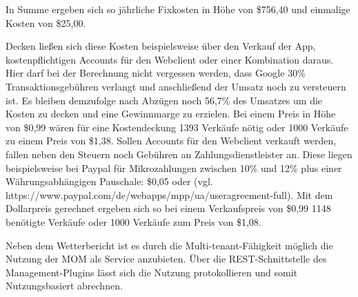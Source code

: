 In Summe ergeben sich so jährliche Fixkosten in Höhe von \$756,40 und einmalige Kosten von \$25,00.

Decken ließen sich diese Kosten beispielsweise über den Verkauf der App, kostenpflichtigen Accounts für den Webclient oder einer Kombination daraus. Hier darf bei der Berechnung nicht vergessen werden, dass Google 30\% Transaktionsgebühren verlangt und anschließend der Umsatz noch zu versteuern ist. Es bleiben demzufolge nach Abzügen noch 56,7\% des Umsatzes um die Kosten zu decken und eine Gewinnmarge zu erzielen. Bei einem Preis in Höhe von \$0,99 wären für eine Kostendeckung 1393 Verkäufe nötig oder 1000 Verkäufe zu einem Preis von \$1,38. Sollen Accounts für den Webclient verkauft werden, fallen neben den Steuern noch Gebühren an Zahlungsdienstleister an. Diese liegen beispielsweise bei Paypal für Mikrozahlungen zwischen 10\% und 12\% plus einer Währungsabhängigen Pauschale: \$0,05 oder  (vgl. https://www.paypal.com/de/webapps/mpp/ua/useragreement-full). Mit dem Dollarpreis gerechnet ergeben sich so bei einem Verkaufspreis von \$0,99 1148 benötigte Verkäufe oder 1000 Verkäufe zum Preis von \$1,08.

Neben dem Wetterbericht ist es durch die Multi-tenant-Fähigkeit möglich die Nutzung der MOM als Service anzubieten. Über die REST-Schnittstelle des Management-Plugins lässt sich die Nutzung protokollieren und somit Nutzungsbasiert abrechnen.